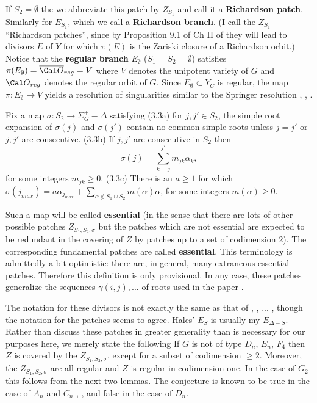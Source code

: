 If $S_2 =\emptyset$ the we abbreviate this patch by
$Z_{S_1}$ and call it a {\bf Richardson patch}.
Similarly for $E_{S_1}$, which we call a {\bf Richardson branch}.
(I call the $Z_{S_1}$
``Richardson patches'', since by Proposition 9.1 of Ch II of \cite{H1}
they will lead to divisors $E$ of $Y$ for which
$\pi(E)$ is the Zariski closure of a Richardson orbit.) Notice that the
{\bf regular branch} $E_\emptyset$ ($S_1=S_2=\emptyset$) satisfies
$\pi(E_\emptyset)=\overline{\Cal O}_{reg}=V$ where $V$ denotes the unipotent
variety of $G$ and ${\Cal O}_{reg}$ denotes the regular orbit of
$G$. Since $E_\emptyset\subset Y_C$ is regular,
the map $\pi:E_\emptyset \rightarrow V$ yields a resolution of singularities
similar to the Springer resolution \cite{Slo}, \cite{Sp}, \cite{St}. 
\par
Fix a map $\sigma :S_2 \rightarrow \Sigma_G^+ -\Delta$ satisfying
\newline
(3.3a) for $j,j'\in S_2$, the simple root expansion of $\sigma(j)$ and
$\sigma(j')$ contain no common simple roots unless $j=j'$ or
$j,j'$ are consecutive. 
\newline
(3.3b) If $j,j'$ are consecutive in $S_2$ then
$$
\sigma(j)=\sum_{k=j}^{j'}m_{jk}\alpha_k,
$$
for some integers $m_{jk}\geq 0$.
\newline
(3.3c) There is an $a\geq 1$ for which $\sigma(j_{max})
=a\alpha_{j_{max}}+\sum_{\alpha\notin S_1\cup S_2}m(\alpha)\alpha$,
for some integers $m(\alpha)\geq 0$.
\par
Such a map will be called {\bf essential} (in the sense that there
are lots of other possible patches $Z_{S_1,S_2,\sigma}$ but the
patches which are not essential are expected to be
redundant in the covering of $Z$ by patches up to a set of codimension $2$). 
The corresponding fundamental patches are called {\bf essential}.
This terminology is admittedly a bit optimistic: there are, in general,
many extraneous essential patches. Therefore this definition is
only provisional. In any case, these patches generalize the
sequences $\gamma(i,j),...$ of roots used in the paper \cite{H2}.
\par
{} The notation for these divisors is not
exactly the same as that of \cite{H1}, \cite{H2}, ... , though the notation 
for the patches seems to agree. Hales' $E_S$ is usually my $E_{\Delta -S}$.
\endproclaim
Rather than discuss these patches in greater generality
than is necessary for 
our purposes here, we merely state the following
 If $G$ is not of type $D_n$, $E_n$, $F_4$ then
$Z$ is covered by the $Z_{S_1,S_2,\sigma}$, except for
a subset of codimension $\geq 2$. Moreover, the $Z_{S_1,S_2,\sigma}$
are all regular and $Z$ is regular in codimension one.
\endproclaim
In the case of $G_2$ this follows from the next two lemmas.
The conjecture is known to be true in the case of $A_n$ and
$C_n$ \cite{H1}, \cite{H2}, and false in the case of $D_n$.

